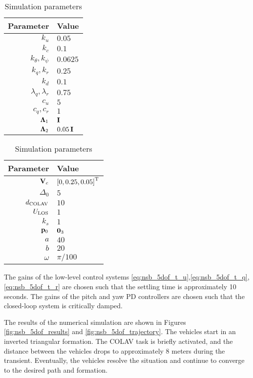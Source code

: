 \begin{table}[htb]
    \centering
    \begin{tabular}[t]{r|l}
        {\bf Parameter} & {\bf Value} \\ \hline
        $k_u$ & $0.05$ \\
        $k_c$ & $0.1$ \\
        $k_{\theta}, k_{\psi}$ & $0.0625$ \\
        $k_q, k_r$ & $0.25$ \\
        $k_d$ & $0.1$ \\
        $\lambda_q, \lambda_r$ & $0.75$ \\
        $c_u$ & $5$ \\
        $c_q, c_r$ & $1$ \\
        $\bm{\Lambda}_1$ & $\mathbf{I}$ \\
        $\bm{\Lambda}_2$ & $0.05\,\mathbf{I}$
    \end{tabular}
    \begin{tabular}[t]{r|l}
        {\bf Parameter} & {\bf Value} \\ \hline
        $\mathbf{V}_c$ & $\left[0, 0.25, 0.05\right]^{\mathrm{T}}$ \\
        $\Delta_0$ & $5$ \\
        $d_{\rm COLAV}$ & $10$ \\
        $U_{\rm LOS}$ & $1$ \\
        $k_{s}$ & $1$ \\
        $\mathbf{p}_0$ & $\mathbf{0}_3$ \\
        $a$ & $40$ \\
        $b$ & $20$ \\
        $\omega$ & $\pi / 100$
    \end{tabular}
    \caption{Simulation parameters}
    \label{tab:nsb_5dof_params}
\end{table}

The gains of the low-level control systems \eqref{eq:nsb_5dof_t_u},\eqref{eq:nsb_5dof_t_q},\eqref{eq:nsb_5dof_t_r} are chosen such that the settling time is approximately 10 seconds.
The gains of the pitch and yaw PD controllers are chosen such that the closed-loop system is critically damped.

The results of the numerical simulation are shown in Figures \ref{fig:nsb_5dof_results} and \ref{fig:nsb_5dof_trajectory}.
The vehicles start in an inverted triangular formation.
The COLAV task is briefly activated, and the distance between the vehicles drops to approximately 8 meters during the transient.
Eventually, the vehicles resolve the situation and continue to converge to the desired path and formation.

